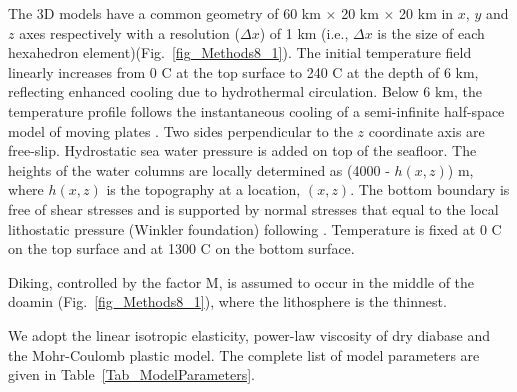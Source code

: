 The 3D models have a common geometry of 60 km $\times$ 20 km $\times$ 20 km in $x$, $y$ and $z$ axes respectively with a resolution ($\Delta x$) of 1 km (i.e., $\Delta x$ is the size of each hexahedron element)(Fig.~\ref{fig_Methods8_1}). %
The initial temperature field linearly increases from 0 \degree C at the top surface to 240 \degree C at the depth of 6 km, reflecting enhanced cooling due to hydrothermal circulation. Below 6 km, the temperature profile follows the instantaneous cooling of a semi-infinite half-space model of moving plates \citep[e.g.,][]{Turcotte2002}. Two sides perpendicular to the $z$ coordinate axis are free-slip. Hydrostatic sea water pressure is added on top of the seafloor. The heights of the water columns are locally determined as (4000 - $h(x,z)$) m, where $h(x,z)$ is the topography at a location, $(x,z)$. The bottom boundary is free of shear stresses and is supported by normal stresses that equal to the local lithostatic pressure (Winkler foundation) following \citet{Buck2005}. Temperature is fixed at 0 \degree C on the top surface and at 1300 \degree C on the bottom surface. 

Diking, controlled by the factor M, is assumed to occur in the middle of the doamin (Fig.~\ref{fig_Methods8_1}), where the lithosphere is the thinnest.

We adopt the linear isotropic elasticity, power-law viscosity of dry diabase \citep[e.g.,][]{Kirby1987, Buck2005} and the Mohr-Coulomb plastic model. The complete list of model parameters are given in Table~\hyperref[Tab_ModelParameters]{\ref{Tab_ModelParameters}}.

